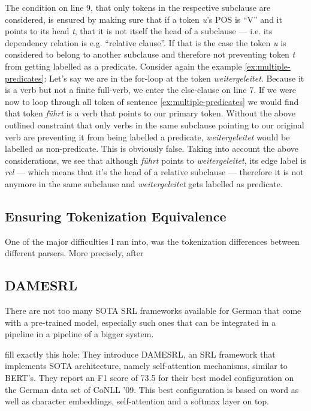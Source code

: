 The condition on line 9, that only tokens in the respective subclause are considered, is ensured by making sure that if a token \textit{u}'s POS is ``V'' and it points to its head \textit{t}, that it is not itself the head of a subclause --- i.e. its dependency relation is e.g. ``relative clause''.
If that is the case the token \textit{u} is considered to belong to another subclause and therefore not preventing token \textit{t} from getting labelled as a predicate.
Consider again the example \ref{ex:multiple-predicates}: 
Let's say we are in the for-loop at the token \textit{weitergeleitet}.
Because it is a verb but not a finite full-verb, we enter the else-clause on line 7.
If we were now to loop through all token of sentence \ref{ex:multiple-predicates} we would find that token \textit{führt} is a verb that points to our primary token.
Without the above outlined constraint that only verbs in the same subclause pointing to our original verb are preventing it from being labelled a predicate, \textit{weitergeleitet} would be labelled as non-predicate.
This is obviously false.
Taking into account the above considerations, we see that although \textit{führt} points to \textit{weitergeleitet}, its edge label is \textit{rel} --- which means that it's the head of a relative subclause --- therefore it is not anymore in the same subclause and \textit{weitergeleitet} gets labelled as predicate.

\subsection{Ensuring Tokenization Equivalence}

One of the major difficulties I ran into, was the tokenization differences between different parsers.
More precisely, after 

\subsection{DAMESRL}

There are not too many SOTA SRL frameworks available for German that come with a pre-trained model, especially such ones that can be integrated in a pipeline in a pipeline of a bigger system.

\cite{do2018flexible} fill exactly this hole: They introduce DAMESRL, an SRL framework that implements SOTA architecture, namely self-attention mechanisms, similar to BERT's.
They report an F1 score of 73.5 for their best model configuration on the German data set of CoNLL '09.
This best configuration is based on word as well as character embeddings, self-attention and a softmax layer on top.

